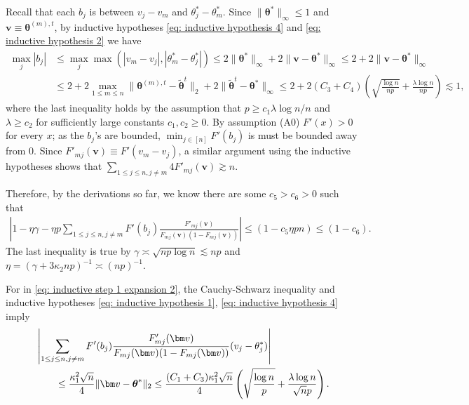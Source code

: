 \documentclass[letterpaper,12pt]{article}
\newcommand*\circled[1]{\tikz[baseline=(char.base)]{
		\node[shape=circle, draw, inner sep=1pt, 
	 	minimum height=12pt] (char) {#1};}}
\numberwithin{equation}{section}
\theoremstyle{plain}
\numberwithin{Theorem}{section}
\numberwithin{corollary}{section}
\numberwithin{proposition}{section}
\numberwithin{Lemma}{section}
{
	\theoremstyle{definition}
	\newtheorem{Definition}{Definition}
	\newtheorem{example}{Example}
	\numberwithin{example}{section}
	\newtheorem{fact}{Fact}
	\numberwithin{fact}{section}
	\newtheorem{remark}{Remark}
}
\newcommand{\1}{\mathbbm{1}}
\def\bth{{\boldsymbol{\theta}}}
\begin{document}
	Recall that each $b_j$ is between $v_j-v_m$ and $\theta^*_j - \theta^*_m$. Since $\|\bth^*\|_\infty \leq 1$ and $\bm v \equiv \bth^{(m), t}$, by inductive hypotheses \eqref{eq: inductive hypothesis 4} and \eqref{eq: inductive hypothesis 2} we have
	\begin{align*}
		\max_j |b_j| &\leq \max_j \max(|v_m - v_j|, |\theta^*_m - \theta^*_j|) \leq 2\|\bth^*\|_\infty + 2\|\bm v  - \bth^*\|_\infty \leq 2 + 2\|\bm v  - \bth^*\|_\infty \\
		&\leq 2 + 2\max_{1 \leq m \leq n}\|\bth^{(m), t} - \widetilde\bth^t\|_2 + 2\|\widetilde\bth^t - \bth^*\|_\infty \leq 2 + 2(C_3 + C_4)\left(\sqrt{\frac{\log n}{np}} + \frac{\lambda\log n}{np}\right) \lesssim 1,
	\end{align*}
	where the last inequality holds by the assumption that $p \geq c_1 \lambda \log n/n$ and $\lambda \geq c_2$ for sufficiently large constants $c_1, c_2 \geq 0$. By assumption (A0) $F'(x) > 0$ for every $x$; as the $b_j$'s are bounded, $\min_{j \in [n]} F'(b_j)$ is must be bounded away from $0$. Since $F'_{mj}(\bm v) \equiv F'(v_m - v_j)$, a similar argument using the inductive hypotheses shows that $\sum_{1 \leq j \leq n, j \neq m}4F'_{mj}(\bm v) \gtrsim n$. 
	
	Therefore, by the derivations so far, we know there are some $c_5 > c_6 > 0$ such that
	\begin{align}
		\left|1 - \eta\gamma - \eta p\sum_{1 \leq j \leq n, j \neq m} F'(b_j)\frac{F'_{mj}(\bm v)}{F_{mj}(\bm v)(1 - F_{mj}(\bm v))}\right| \leq (1 - c_5 \eta p n) \leq (1-c_6).\label{eq: inductive step 3 expansion 2.1}
	\end{align}
	The last inequality is true by $\gamma \asymp \sqrt{np \log n} \lesssim np$ and $\eta = (\gamma + 3\kappa_2 np)^{-1} \asymp (np)^{-1}$.
	
	For \circled{2} in \eqref{eq: inductive step 1 expansion 2}, the Cauchy-Schwarz inequality and inductive hypotheses \eqref{eq: inductive hypothesis 1}, \eqref{eq: inductive hypothesis 4} imply
	\begin{align}
		&\left|\sum_{1 \leq j \leq n, j \neq m} F'(b_j)\frac{F'_{mj}(\bm v)}{F_{mj}(\bm v)(1 - F_{mj}(\bm v))}(v_j - \theta^*_j)\right| \notag \\
		&\quad \quad \leq \frac{\kappa_1^2 \sqrt{n}}{4}\|\bm v - \bth^*\|_2 \leq \frac{(C_1 + C_3)\kappa_1^2\sqrt{n}}{4} \left(\sqrt{\frac{\log n}{p}} + \frac{\lambda\log n}{\sqrt{n}p}\right). \label{eq: inductive step 3 expansion 2.2}
	\end{align}
	
\end{document}
